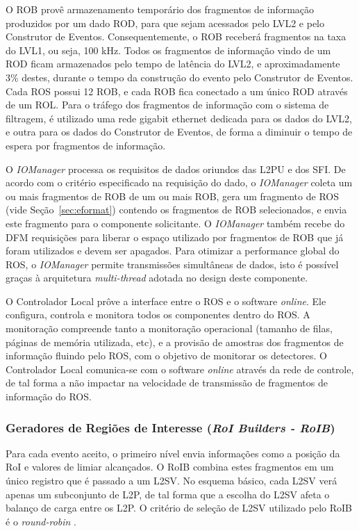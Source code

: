 O ROB provê armazenamento temporário dos fragmentos de informação produzidos por um dado ROD, para que sejam acessados pelo LVL2 e pelo Construtor de Eventos. Consequentemente, o ROB receberá fragmentos na taxa do LVL1, ou seja, 100 kHz. Todos os fragmentos de informação vindo de um ROD ficam armazenados pelo tempo de latência do LVL2, e aproximadamente 3\% destes, durante o tempo da construção do evento pelo Construtor de Eventos. Cada ROS possui 12 ROB, e cada ROB fica conectado a um único ROD através de um ROL. Para o tráfego dos fragmentos de informação com o sistema de filtragem, é utilizado uma rede gigabit ethernet dedicada para os dados do LVL2, e outra para os dados do Construtor de Eventos, de forma a diminuir o tempo de espera por fragmentos de informação. 

O \emph{IOManager} processa os requisitos de dados oriundos das L2PU e dos SFI. De acordo com o critério especificado na requisição do dado, o \emph{IOManager} coleta um ou mais fragmentos de ROB de um ou mais ROB, gera um fragmento de ROS (vide Seção~\ref{sec:eformat}) contendo os fragmentos de ROB selecionados, e envia este fragmento para o componente solicitante. O \emph{IOManager} também recebe do DFM requisições para liberar o espaço utilizado por fragmentos de ROB que já foram utilizados e devem ser apagados. Para otimizar a performance global do ROS, o \emph{IOManager} permite transmissões simultâneas de dados, isto é possível graças à arquitetura \emph{multi-thread} adotada no design deste componente.

 O Controlador Local prôve a interface entre o ROS e o software \emph{online}. Ele configura, controla e monitora todos os componentes dentro do ROS. A monitoração compreende tanto a monitoração operacional (tamanho de filas, páginas de memória utilizada, etc), e a provisão de amostras dos fragmentos de informação fluindo pelo ROS, com o objetivo de monitorar os detectores. O Controlador Local comunica-se com o software \emph{online} através da rede de controle, de tal forma a não impactar na velocidade de transmissão de fragmentos de informação do ROS.


\subsubsection{Geradores de Regiões de Interesse (\emph{RoI Builders - RoIB})}
\label{sec:roib}

Para cada evento aceito, o primeiro nível envia informações como a posição da RoI e valores de limiar alcançados. O RoIB combina estes fragmentos em um único registro que é passado a um L2SV. No esquema básico, cada L2SV verá apenas um subconjunto de L2P, de tal forma que a escolha do L2SV afeta o balanço de carga entre os L2P. O critério de seleção de L2SV utilizado pelo RoIB é o \emph{round-robin} \cite{bib:modern_operating_systems}.


